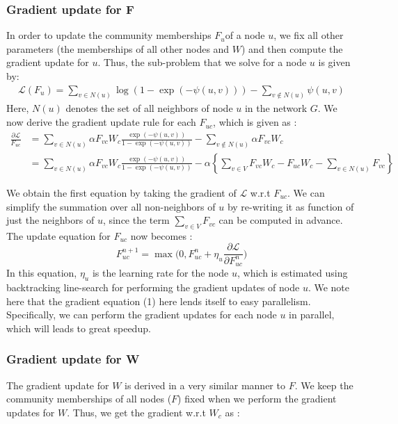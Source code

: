 \documentclass[11pt]{article}
\begin{document}
\subsubsection*{Gradient update for F}
In order to update the community memberships $F_u $of a node $u$, we fix all other parameters (the memberships of all other nodes and $W$) and then compute the gradient update for $u$. Thus, the sub-problem that we solve for a node $u$ is given by: 
\begin{align*}
\mathcal{L} (F_u) = \sum\limits_{v \in N(u)} \log (1 - \exp(- \psi(u,v)))  - \sum\limits_{v \notin N(u)} \psi(u,v)
\end{align*}
Here, $N(u)$ denotes the set of all neighbors of node $u$ in the network $G$.
We now derive the gradient update rule for each $F_{uc}$, which is given as : 
\begin{align*}
\frac{\partial \mathcal{L}}{F_{uc}} &= \sum\limits_{v \in N(u) } \alpha F_{vc} W_c \frac{\exp(- \psi(u,v))}{1 - \exp(-\psi(u,v))} - \sum\limits_{v \notin N(u)} \alpha F_{vc} W_c  \\ 
&= \sum\limits_{v \in N(u) } \alpha F_{vc} W_c \frac{\exp(- \psi(u,v))}{1 - \exp(-\psi(u,v))}  - \alpha \left\lbrace \sum\limits_{v \in V} F_{vc} W_c - F_{uc} W_c - \sum\limits_{v \in N(u)} F_{vc} \right\rbrace
\end{align*}

We obtain the first equation by taking the gradient of $\mathcal{L}$ w.r.t $F_{uc}$. We can simplify the summation over all non-neighbors of $u$ by re-writing it as function of just the neighbors of $u$, since the term $\sum\limits_{v \in V} F_{vc}$ can be computed in advance. The update equation for $F_{uc}$ now becomes : 
\begin{equation} \label{gradf}
 F_{uc}^{n+1} =  \max \Big(0, F_{uc}^n  + \eta_u \frac{\partial \mathcal{L}}{\partial F_{uc}^n}\Big) 
\end{equation}
In this equation, $\eta_{u}$ is the learning rate for the node $u$, which is estimated using backtracking line-search \cite{boyd} for performing the gradient updates of node $u$. We note here that the gradient equation (1) here lends itself to easy parallelism. Specifically, we can perform the gradient updates for each node $u$ in parallel, which will leads to great speedup. 
\subsubsection*{Gradient update for W}
The gradient update for $W$ is derived in a very similar manner to $F$. We keep the community memberships of all nodes ($F$) fixed when we perform the gradient updates for $W$. Thus, we get the gradient w.r.t $W_c$ as : 
\end{document}
